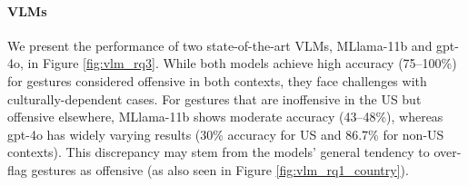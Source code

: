 \paragraph{VLMs} We present the performance of two state-of-the-art VLMs, MLlama-11b and gpt-4o, in Figure \ref{fig:vlm_rq3}. While both models achieve high accuracy (75–100\%) for gestures considered offensive in both contexts, they face challenges with culturally-dependent cases.  For gestures that are inoffensive in the US but offensive elsewhere, MLlama-11b shows moderate accuracy (43–48\%), whereas gpt-4o has widely varying results (30\% accuracy for US and 86.7\% for non-US contexts). This discrepancy may stem from the models' general tendency to over-flag gestures as offensive (as also seen in Figure \ref{fig:vlm_rq1_country}). 


